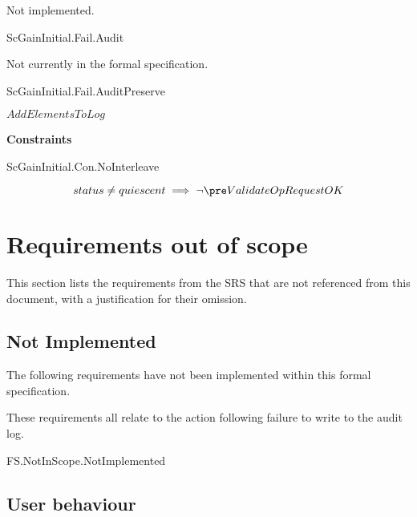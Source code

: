 Not implemented.

{\footnotesize \sf
ScGainInitial.Fail.Audit
}

Not currently in the formal specification.

{\footnotesize \sf
ScGainInitial.Fail.AuditPreserve
}

$AddElementsToLog$

{\footnotesize \sf
{\bf Constraints}

\sf
ScGainInitial.Con.NoInterleave
}

\[ 
status \neq quiescent \implies \lnot \pre ValidateOpRequestOK
\]

\section{Requirements out of scope}
This section lists the requirements from the SRS \cite{SRS} that are
not referenced from this 
document, with a justification for their omission.

\subsection{Not Implemented}

The following requirements have not been implemented within this
formal specification.

These requirements all relate to the action following failure to write 
to the audit log.

\begin{traceunit}{FS.NotInScope.NotImplemented}
\end{traceunit}%

\subsection{User behaviour}


